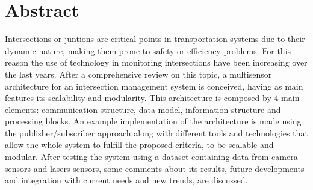 \documentclass{book}
\begin{document}





%

\chapter*{Abstract}
%
Intersections or juntions are critical points in transportation systems due to their dynamic nature, making them prone to safety or efficiency problems. For this reason the use of technology in monitoring intersections have been increasing over the last years. After a comprehensive review on this topic, a  multisensor architecture for an intersection management system is conceived, having as main features its scalability and modularity. This architecture is composed by 4 main elements: communication structure, data model, information structure and processing blocks. An example implementation of the architecture is made using the publisher/subscriber approach along with different tools and technologies that allow the whole system to fulfill the proposed criteria, to be scalable and modular. After testing the system using a dataset containing data from camera sensors and lasers sensors, some comments about its results, future developments and integration with current needs and new trends, are discussed.



\end{document}
